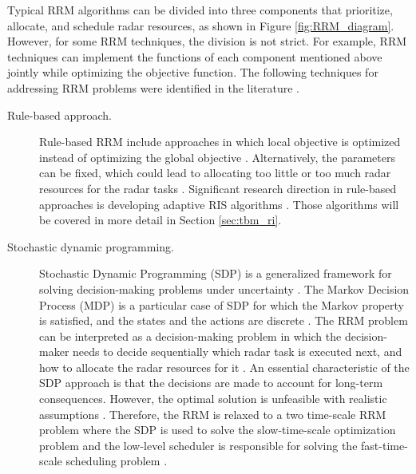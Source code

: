\documentclass[english, 12pt, a4paper, elec, utf8, a-1b, online]{aaltothesis}
\begin{document}
Typical RRM algorithms can be divided into three components that prioritize, allocate, and schedule radar resources, as shown in Figure \ref{fig:RRM_diagram}.
However, for some RRM techniques, the division is not strict.
For example, RRM techniques can implement the functions of each component mentioned above jointly while optimizing the objective function.
The following techniques for addressing RRM problems were identified in the literature \cite{Moo2016, Koch1999, Krishnamurthy2001, Wintenby2006, LaScala2006, Rajkumar1997, Rajkumar1998, Kastella1997, Kreucher2004, Kreucher2005, Xu2010}.

\begin{description}

\item[Rule-based approach.]

Rule-based RRM include approaches in which local objective is optimized instead of optimizing the global objective \cite{Koch1999}.
Alternatively, the parameters can be fixed, which could lead to allocating too little or too much radar resources for the radar tasks \cite{Hoffmann2014}.
Significant research direction in rule-based approaches is developing adaptive RIS algorithms \cite{Cohen1986, Gardner1988, Munu1992, ChengTing2007, Baek2010, Watson1993, Charlish2015, Keuk1975, Shin1995, Benoudnine2006}. Those algorithms will be covered in more detail in Section \ref{sec:tbm_ri}.


\item[Stochastic dynamic programming.]

Stochastic Dynamic Programming (SDP) is a generalized framework for solving decision-making problems under uncertainty \cite{Ross1983}. 
The Markov Decision Process (MDP) is a particular case of SDP for which the Markov property is satisfied, and the states and the actions are discrete \cite{Ross1983}.
The RRM problem can be interpreted as a decision-making problem in which the decision-maker needs to decide sequentially which radar task is executed next, and how to allocate the radar resources for it \cite{Krishnamurthy2001, Wintenby2006, LaScala2006}.
An essential characteristic of the SDP approach is that the decisions are made to account for long-term consequences.
However, the optimal solution is unfeasible with realistic assumptions \cite{Wintenby2006}.
Therefore, the RRM is relaxed to a two time-scale RRM problem where the SDP is used to solve the slow-time-scale optimization problem and the low-level scheduler is responsible for solving the fast-time-scale scheduling problem \cite{Wintenby2006}.  



\end{description}
\end{document}
